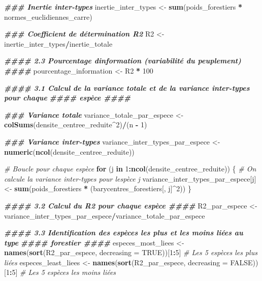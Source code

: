 \documentclass[
]{article}
\newenvironment{Shaded}{\begin{snugshade}}{\end{snugshade}}
\newcommand{\AttributeTok}[1]{\textcolor[rgb]{0.13,0.29,0.53}{#1}}
\newcommand{\CommentTok}[1]{\textcolor[rgb]{0.56,0.35,0.01}{\textit{#1}}}
\newcommand{\ConstantTok}[1]{\textcolor[rgb]{0.56,0.35,0.01}{#1}}
\newcommand{\ControlFlowTok}[1]{\textcolor[rgb]{0.13,0.29,0.53}{\textbf{#1}}}
\newcommand{\DecValTok}[1]{\textcolor[rgb]{0.00,0.00,0.81}{#1}}
\newcommand{\DocumentationTok}[1]{\textcolor[rgb]{0.56,0.35,0.01}{\textbf{\textit{#1}}}}
\newcommand{\FunctionTok}[1]{\textcolor[rgb]{0.13,0.29,0.53}{\textbf{#1}}}
\newcommand{\NormalTok}[1]{#1}
\newcommand{\OtherTok}[1]{\textcolor[rgb]{0.56,0.35,0.01}{#1}}
\newcommand{\SpecialCharTok}[1]{\textcolor[rgb]{0.81,0.36,0.00}{\textbf{#1}}}
\begin{document}
\begin{Shaded}
\begin{Highlighting}[]
\DocumentationTok{\#\#\# Inertie inter{-}types}
\NormalTok{inertie\_inter\_types }\OtherTok{\textless{}{-}} \FunctionTok{sum}\NormalTok{(poids\_forestiers }\SpecialCharTok{*}\NormalTok{ normes\_euclidiennes\_carre)}

\DocumentationTok{\#\#\# Coefficient de détermination R2}
\NormalTok{R2 }\OtherTok{\textless{}{-}}\NormalTok{ inertie\_inter\_types}\SpecialCharTok{/}\NormalTok{inertie\_totale}

\DocumentationTok{\#\#\#\# 2.3 Pourcentage d\textquotesingle{}information (variabilité du peuplement) \#\#\#\#}
\NormalTok{pourcentage\_information }\OtherTok{\textless{}{-}}\NormalTok{ R2 }\SpecialCharTok{*} \DecValTok{100}

\DocumentationTok{\#\#\#\# 3.1 Calcul de la variance totale et de la variance inter{-}types pour chaque}
\DocumentationTok{\#\#\#\# espèce \#\#\#\#}

\DocumentationTok{\#\#\# Variance totale}
\NormalTok{variance\_totale\_par\_espece }\OtherTok{\textless{}{-}} \FunctionTok{colSums}\NormalTok{(densite\_centree\_reduite}\SpecialCharTok{\^{}}\DecValTok{2}\NormalTok{)}\SpecialCharTok{/}\NormalTok{(n }\SpecialCharTok{{-}} \DecValTok{1}\NormalTok{)}

\DocumentationTok{\#\#\# Variance inter{-}types}
\NormalTok{variance\_inter\_types\_par\_espece }\OtherTok{\textless{}{-}} \FunctionTok{numeric}\NormalTok{(}\FunctionTok{ncol}\NormalTok{(densite\_centree\_reduite))}

\CommentTok{\# Boucle pour chaque espèce}
\ControlFlowTok{for}\NormalTok{ (j }\ControlFlowTok{in} \DecValTok{1}\SpecialCharTok{:}\FunctionTok{ncol}\NormalTok{(densite\_centree\_reduite)) \{}
    \CommentTok{\# On calcule la variance inter{-}types pour l\textquotesingle{}espèce j}
\NormalTok{    variance\_inter\_types\_par\_espece[j] }\OtherTok{\textless{}{-}} \FunctionTok{sum}\NormalTok{(poids\_forestiers }\SpecialCharTok{*}\NormalTok{ (barycentres\_forestiers[,}
\NormalTok{        j]}\SpecialCharTok{\^{}}\DecValTok{2}\NormalTok{))}
\NormalTok{\}}

\DocumentationTok{\#\#\#\# 3.2 Calcul du R2 pour chaque espèce \#\#\#\#}
\NormalTok{R2\_par\_espece }\OtherTok{\textless{}{-}}\NormalTok{ variance\_inter\_types\_par\_espece}\SpecialCharTok{/}\NormalTok{variance\_totale\_par\_espece}

\DocumentationTok{\#\#\#\# 3.3 Identification des espèces les plus et les moins liées au type}
\DocumentationTok{\#\#\#\# forestier \#\#\#\#}
\NormalTok{especes\_most\_liees }\OtherTok{\textless{}{-}} \FunctionTok{names}\NormalTok{(}\FunctionTok{sort}\NormalTok{(R2\_par\_espece, }\AttributeTok{decreasing =} \ConstantTok{TRUE}\NormalTok{))[}\DecValTok{1}\SpecialCharTok{:}\DecValTok{5}\NormalTok{]  }\CommentTok{\# Les 5 espèces les plus liées}
\NormalTok{especes\_least\_liees }\OtherTok{\textless{}{-}} \FunctionTok{names}\NormalTok{(}\FunctionTok{sort}\NormalTok{(R2\_par\_espece, }\AttributeTok{decreasing =} \ConstantTok{FALSE}\NormalTok{))[}\DecValTok{1}\SpecialCharTok{:}\DecValTok{5}\NormalTok{]  }\CommentTok{\# Les 5 espèces les moins liées}


\end{Highlighting}
\end{Shaded}
\end{document}
